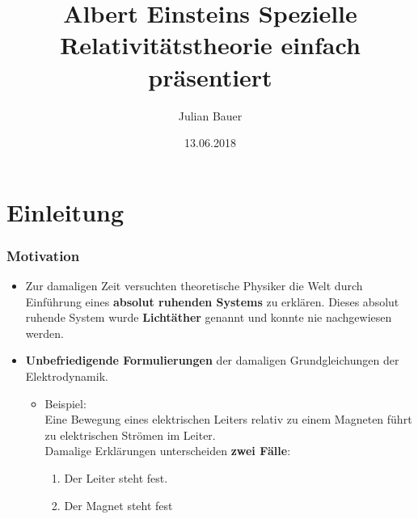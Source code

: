 \documentclass[]{beamer}%
\begin{document}
\title{
        Albert Einsteins \glqq{}Spezielle Relativitätstheorie\grqq{} 
        einfach präsentiert
}
\author[Julian Bauer]{
        \begin{tabular}{c} 
                Julian Bauer 
        \end{tabular}
}
\date[]{13.06.2018}

\begin{frame}
    \titlepage
\end{frame}

\begin{frame}
    \tableofcontents
\end{frame}

\section{Einleitung}
\begin{frame}
\end{frame}

\begin{frame}
	\frametitle{Motivation}
    \begin{itemize}
    	\item   Zur damaligen Zeit versuchten theoretische Physiker die Welt durch 
                Einführung eines \textbf{absolut ruhenden Systems} zu erklären.
                Dieses absolut ruhende System wurde \textbf{Lichtäther} genannt und
                konnte nie nachgewiesen werden.
                \vspace{10pt}
        \item   \textbf{Unbefriedigende Formulierungen} der damaligen Grundgleichungen 
                der Elektrodynamik.
        \begin{itemize}
			\item   Beispiel:\\
                        Eine Bewegung eines elektrischen Leiters relativ zu einem
                        Magneten führt zu elektrischen Strömen im Leiter.\\
                        Damalige Erklärungen unterscheiden \textbf{zwei Fälle}:
                        \begin{enumerate}
                        	\item Der Leiter steht fest.
                            \item Der Magnet steht fest
                        \end{enumerate}
		\end{itemize}
	\end{itemize}
\end{frame}
\end{document}
